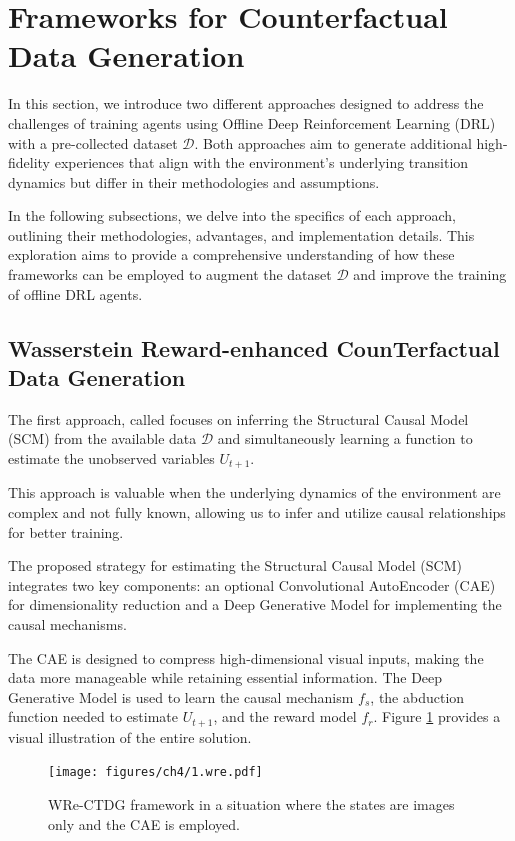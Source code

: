 \section{Frameworks for Counterfactual Data Generation}

In this section, we introduce two different approaches designed to
address the challenges of training agents using Offline
Deep Reinforcement Learning (DRL) with a pre-collected dataset \( \mathcal{D} \).
Both approaches aim to generate additional high-fidelity experiences
that align with the environment's underlying transition dynamics
but differ in their methodologies and assumptions.

In the following subsections, we delve into the specifics
of each approach, outlining their methodologies, advantages, and
implementation details. This exploration aims to
provide a comprehensive understanding of how these
frameworks can be employed to augment the dataset \( \mathcal{D} \) and improve
the training of offline DRL agents.

\subsection{Wasserstein Reward-enhanced CounTerfactual\\ Data Generation}
\label{sec:wre}

The first approach, called  focuses on inferring the Structural Causal Model
(SCM) from the available data \( \mathcal{D} \) and simultaneously learning
a function to estimate the unobserved variables $U_{t+1}$.

This approach is valuable when the underlying dynamics of the
environment are complex and not fully known, allowing us to
infer and utilize causal relationships for better training.

The proposed strategy for estimating the Structural Causal Model (SCM)
integrates two key components: an optional Convolutional AutoEncoder (CAE)
for dimensionality reduction and a Deep Generative Model for
implementing the causal mechanisms.

The CAE is designed to compress high-dimensional visual inputs,
making the data more manageable while retaining essential information.
The Deep Generative Model is used to learn the causal mechanism \( f_s \),
the abduction function needed to estimate \( U_{t+1} \),
and the reward model \( f_r \).
Figure \ref{fig:wre} provides a visual illustration of the entire solution.

\begin{figure}[ht]
    \centering
    \texttt{[image: figures/ch4/1.wre.pdf]}
    \caption{WRe-CTDG framework in a situation where the states are
    images only and the CAE is employed.}
    \label{fig:wre}
\end{figure}


